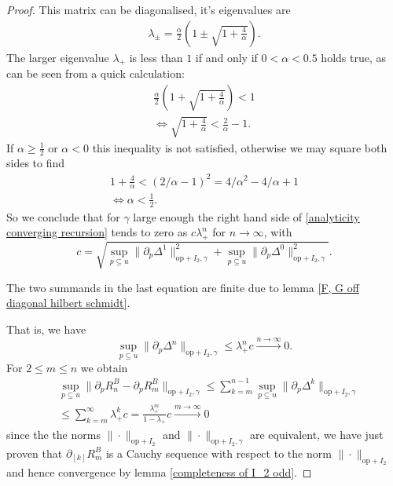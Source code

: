 \documentclass[b5paper,draft,openbib,12pt]{memoir}
\begin{document}
\begin{proof}
This matrix can be diagonalised, it's eigenvalues are
\begin{align}
\lambda_{\pm}= \frac{\alpha}{2}\left(1\pm \sqrt{1+\frac{4}{\alpha}}\right).
\end{align}
The larger eigenvalue \(\lambda_+\) is less than \(1\) if
and only if
\(0<\alpha<0.5\) holds true, as can be seen from a quick 
calculation:
\begin{align}
\frac{\alpha}{2}\left(1+\sqrt{1+\frac{4}{\alpha}}\right)<1 \\
\iff \sqrt{1+\frac{4}{\alpha}}<\frac{2}{\alpha}-1.
\end{align}
If \(\alpha\ge \frac{1}{2}\) or \(\alpha<0\) this inequality is not satisfied, otherwise
we may square both sides to find
\begin{align}
1+\frac{4}{\alpha}<(2/\alpha -1)^2=4/\alpha^2 - 4/\alpha +1\\
\iff \alpha < \frac{1}{2}.
\end{align}
So we conclude that for \(\gamma\) large enough 
the right hand 
side of \eqref{analyticity converging recursion}
tends to zero as \(c \lambda_+^n\) for
\(n\rightarrow \infty\), with
\begin{equation}
c=\sqrt{\sup_{p\subseteq u} \|\partial_p \Delta^1\|^2_{\mathrm{op}+I_2,\gamma}
+\sup_{p\subseteq u} \|\partial_p \Delta^0\|^2_{\mathrm{op}+I_2,\gamma}}.
\end{equation}

The two summands in the last equation are finite due 
to lemma \ref{F, G off diagonal hilbert schmidt}.

That is, we have  
\begin{equation}
\sup_{p\subseteq u}
\|\partial_p \Delta^n\|_{\mathrm{op}+I_2,\gamma}
\le \lambda_+^n c
\xrightarrow{n\rightarrow \infty} 0.
\end{equation}
For \(2\le m\le n\) we obtain  
\begin{align}
&\sup_{p\subseteq u}\| \partial_p R^B_n -
\partial_p R^B_m\|_{\mathrm{op}+I_2,\gamma} 
\le 
\sum_{k=m}^{n-1}
\sup_{p\subseteq u}
\| \partial_p \Delta^k\|_{\mathrm{op}+I_2,\gamma} \\
&\le \sum_{k=m}^{\infty}
\lambda_+^k c
= \frac{\lambda_+^m }{1-\lambda_+} c
\xrightarrow{m\rightarrow \infty}0
\end{align}
since the the norms
\(\|\cdot\|_{\mathrm{op}+I_2}\) and
\(\|\cdot\|_{\mathrm{op}+I_2,\gamma}\) are 
equivalent, we have just proven 
that \(\partial_{[k]} R^B_m\) is a 
Cauchy sequence with respect to the norm 
\(\|\cdot\|_{\mathrm{op}+I_2}\) and 
hence convergence by 
lemma \ref{completeness of I_2 odd}.


\end{proof}
\end{document}
